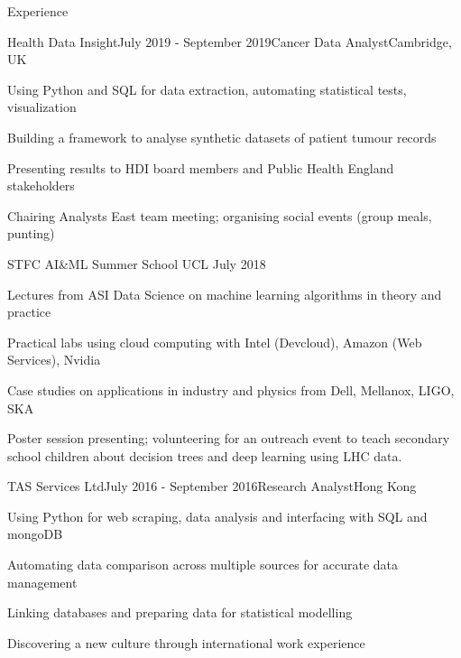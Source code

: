 \documentclass{resume} %
\begin{document}
\begin{rSection}{Experience}

\begin{rSubsection}{Health Data Insight}{July 2019 - September 2019}{Cancer Data Analyst}{Cambridge, UK}
\item Using Python and SQL for data extraction, automating statistical tests, visualization
\item Building a framework to analyse synthetic datasets of patient tumour records
\item Presenting results to HDI board members and Public Health England stakeholders
\item Chairing Analysts East team meeting; organising social events (group meals, punting)
\end{rSubsection}


\begin{rSubsection}{STFC AI\&ML Summer School UCL
}{July 2018}{}{}
\item Lectures from ASI Data Science on machine learning algorithms in theory and practice
\item Practical labs using cloud computing with Intel (Devcloud), Amazon (Web Services), Nvidia
\item Case studies on applications in industry and physics from Dell, Mellanox, LIGO, SKA
\item Poster session presenting; volunteering for an outreach event to teach secondary school children about decision trees and deep learning using LHC data.
\end{rSubsection}


\begin{rSubsection}{TAS Services Ltd}{July 2016 - September 2016}{Research Analyst}{Hong Kong}
\item Using Python for web scraping, data analysis and interfacing with SQL and mongoDB
\item Automating data comparison across multiple sources for accurate data management
\item Linking databases and preparing data for statistical modelling
\item Discovering a new culture through international work experience
\end{rSubsection}



\end{rSection}
\end{document}
